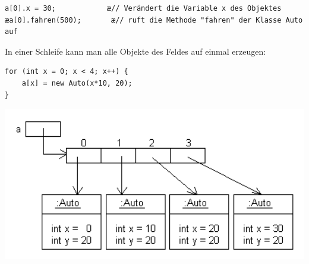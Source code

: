 \begin{lstlisting}
a[0].x = 30;            æ// Verändert die Variable x des Objektes
æa[0].fahren(500);       æ// ruft die Methode "fahren" der Klasse Auto auf
\end{lstlisting}

\pagebreak

In einer Schleife kann man alle Objekte des Feldes auf einmal erzeugen:

\begin{lstlisting}
for (int x = 0; x < 4; x++) {
    a[x] = new Auto(x*10, 20);
}
\end{lstlisting}

\begin{minipage}{0.6\textwidth}
\includegraphics[width=1.0\textwidth]{./inf/SEKII/18_Java_Arrays/Erzeugung3.png}
\end{minipage}
